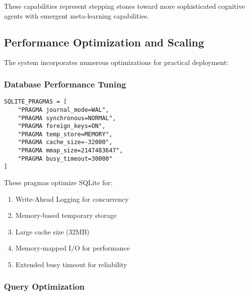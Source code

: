 \documentclass[12pt,a4paper]{article}
\begin{document}
These capabilities represent stepping stones toward more sophisticated cognitive agents with emergent meta-learning capabilities.

\subsection*{Performance Optimization and Scaling}

The system incorporates numerous optimizations for practical deployment:

\subsubsection*{Database Performance Tuning}
\begin{pageablecode}
\begin{verbatim}
SQLITE_PRAGMAS = [
    "PRAGMA journal_mode=WAL",
    "PRAGMA synchronous=NORMAL",
    "PRAGMA foreign_keys=ON",
    "PRAGMA temp_store=MEMORY",
    "PRAGMA cache_size=-32000",
    "PRAGMA mmap_size=2147483647",
    "PRAGMA busy_timeout=30000"
]
\end{verbatim}
\end{pageablecode}
These pragmas optimize SQLite for:
\begin{enumerate}[label=\arabic*.]
    \item Write-Ahead Logging for concurrency
    \item Memory-based temporary storage
    \item Large cache size (32MB)
    \item Memory-mapped I/O for performance
    \item Extended busy timeout for reliability
\end{enumerate}

\subsubsection*{Query Optimization}
\end{document}
